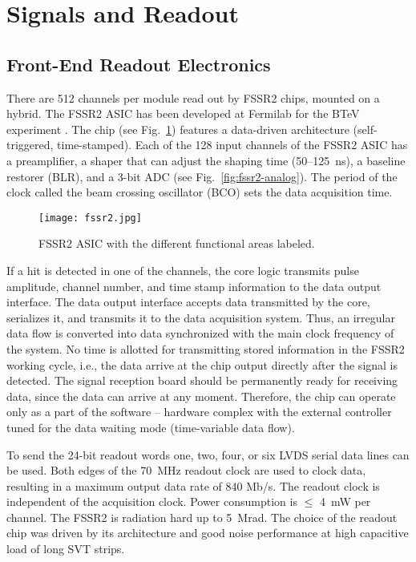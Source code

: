 \section{Signals and Readout}

\subsection{Front-End Readout Electronics}

There are 512 channels per module read out by FSSR2 chips, mounted on a hybrid. The FSSR2 ASIC has been developed at Fermilab for the BTeV experiment \cite{FSSR}. The chip (see Fig.~\ref{fig:fssr2}) features a data-driven architecture (self-triggered, time-stamped). Each of the 128 input channels of the FSSR2 ASIC has a preamplifier, a shaper that can adjust the shaping time (50--125~ns), a baseline restorer (BLR), and a 3-bit ADC (see Fig.~\ref{fig:fssr2-analog}). The period of the clock called the beam crossing oscillator (BCO) sets the data acquisition time. 

\begin{figure}[hbt] 
\centering 
\texttt{[image: fssr2.jpg]}
\caption{FSSR2 ASIC with the different functional areas labeled.}
\label{fig:fssr2}
\end{figure}

If a hit is detected in one of the channels, the core logic transmits pulse amplitude, channel number, and time stamp information to the data output interface. The data output interface accepts data transmitted by the core, serializes it, and transmits it to the data acquisition system. Thus, an irregular data flow is converted into data synchronized with the main clock frequency of the system. No time is allotted for transmitting stored information in the FSSR2 working cycle, i.e., the data arrive at the chip output directly after the signal is detected. The signal reception board should be permanently ready for receiving data, since the data can arrive at any moment. Therefore, the chip can operate only as a part of the software -- hardware complex with the external controller tuned for the data waiting mode (time-variable data flow). 

To send the 24-bit readout words one, two, four, or six LVDS serial data lines can be used. Both edges of the 70~MHz readout clock are used to clock data, resulting in a maximum output data rate of 840 Mb/s. The readout clock is independent of the acquisition clock. Power consumption is $\le$ 4~mW per channel. The FSSR2 is radiation hard up to 5~Mrad. The choice of the readout chip was driven by its architecture and good noise performance at high capacitive load of long SVT strips.

